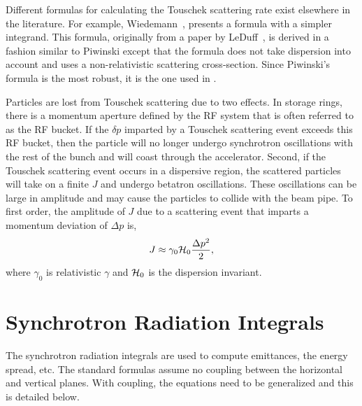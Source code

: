 Different formulas for calculating the Touschek scattering rate exist
elsewhere in the literature.  For example,
Wiedemann~\cite{b:wiedemann}, presents a formula with a simpler
integrand.  This formula, originally from a paper by
LeDuff~\cite{b:leduff}, is derived in a fashion similar to Piwinski
except that the formula does not take dispersion into account and uses
a non-relativistic scattering cross-section.  Since Piwinski's formula
is the most robust, it is the one used in \bmad.

Particles are lost from Touschek scattering due to two effects.  In
storage rings, there is a momentum aperture defined by the RF system
that is often referred to as the RF bucket.  If the $\delta p$
imparted by a Touschek scattering event exceeds this RF bucket, then
the particle will no longer undergo synchrotron oscillations with the
rest of the bunch and will coast through the accelerator.  Second, if
the Touschek scattering event occurs in a dispersive region, the
scattered particles will take on a finite $J$ and undergo betatron
oscillations.  These oscillations can be large in amplitude and may
cause the particles to collide with the beam pipe.  To first order,
the amplitude of $J$ due to a scattering event that imparts a momentum
deviation of $\Delta p$ is,
\begin{equation}
  J\approx\gamma_0{\cal H}_0\frac{\Delta p^2}{2},
\end{equation}
where $\gamma_0$ is relativistic $\gamma$ and ${\cal H}_0$ is the dispersion invariant.

\section{Synchrotron Radiation Integrals}
\label{s:synch.ints}

The synchrotron radiation integrals are used to compute emittances,
the energy spread, etc. The standard formulas assume no coupling
between the horizontal and vertical planes\cite{b:helm,b:jowett}. With
coupling, the equations need to be generalized and this is detailed
below.

